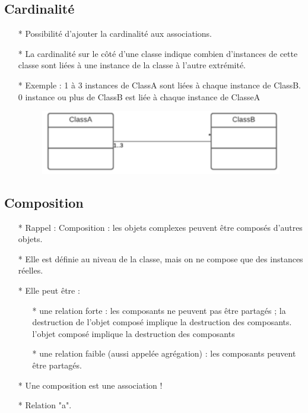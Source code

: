 \documentclass[12pt]{article}
\begin{document}
\subsection{Cardinalité}
\begin{itemize}
	\item[* ] Possibilité d'ajouter la cardinalité aux associations.
	\item[* ] La cardinalité sur le côté d'une classe indique combien d'instances de cette classe sont liées à une instance de la classe à l'autre extrémité.
	\item[* ] Exemple : 1 à 3 instances de ClassA sont liées à chaque instance de ClassB.
 0 instance ou plus de ClassB est liée à chaque instance de
	ClasseA
		\begin{figure}[!hbtp]
		\centering
		\includegraphics[scale=0.75]{Capture13.PNG}
	\end{figure}
\end{itemize}
\subsection{Composition}
\begin{itemize}
	\item[* ] Rappel : Composition : les objets complexes peuvent être composés d'autres
	objets.
	\item[* ] Elle est définie au niveau de la classe, mais on ne compose que des instances réelles.
	\item[* ] Elle peut être :
	\begin{itemize}
		\item[* ] une relation forte : les composants ne peuvent pas être partagés ; la destruction de l'objet composé implique la destruction des composants.
		l'objet composé implique la destruction des composants
		\item[* ] une relation faible (aussi appelée agrégation) : les composants peuvent être partagés.
	
	\end{itemize}
	\item[* ] Une composition est une association !
\item[* ] Relation "a".
\end{itemize}
\end{document}
